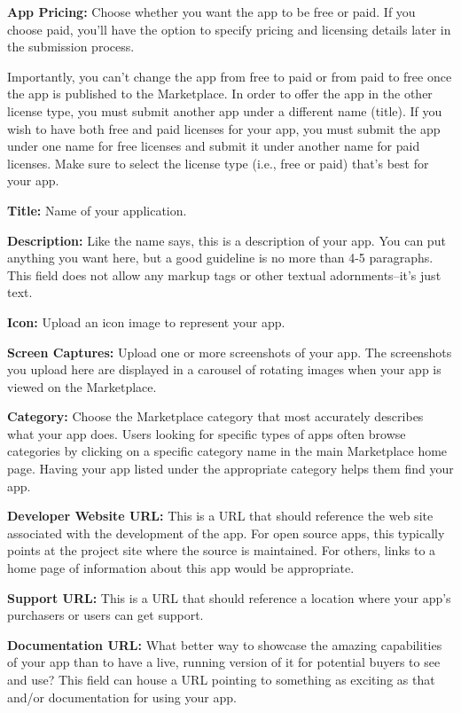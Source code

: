 \textbf{App Pricing:} Choose whether you want the app to be free or
paid. If you choose paid, you'll have the option to specify pricing and
licensing details later in the submission process.

Importantly, you can't change the app from free to paid or from paid to
free once the app is published to the Marketplace. In order to offer the
app in the other license type, you must submit another app under a
different name (title). If you wish to have both free and paid licenses
for your app, you must submit the app under one name for free licenses
and submit it under another name for paid licenses. Make sure to select
the license type (i.e., free or paid) that's best for your app.

\textbf{Title:} Name of your application.

\textbf{Description:} Like the name says, this is a description of your
app. You can put anything you want here, but a good guideline is no more
than 4-5 paragraphs. This field does not allow any markup tags or other
textual adornments--it's just text.

\textbf{Icon:} Upload an icon image to represent your app.

\textbf{Screen Captures:} Upload one or more screenshots of your app.
The screenshots you upload here are displayed in a carousel of rotating
images when your app is viewed on the Marketplace.

\textbf{Category:} Choose the Marketplace category that most accurately
describes what your app does. Users looking for specific types of apps
often browse categories by clicking on a specific category name in the
main Marketplace home page. Having your app listed under the appropriate
category helps them find your app.

\textbf{Developer Website URL:} This is a URL that should reference the
web site associated with the development of the app. For open source
apps, this typically points at the project site where the source is
maintained. For others, links to a home page of information about this
app would be appropriate.

\textbf{Support URL:} This is a URL that should reference a location
where your app's purchasers or users can get support.

\textbf{Documentation URL:} What better way to showcase the amazing
capabilities of your app than to have a live, running version of it for
potential buyers to see and use? This field can house a URL pointing to
something as exciting as that and/or documentation for using your app.

